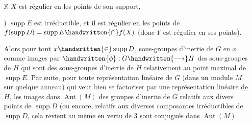
$\mathbb{X}$  $X$ est régulier en les points de son support\handwritten{)},

) $\operatorname{supp}E$ est irréductible, et il est régulier en les points de $f(\operatorname{supp}D)=\operatorname{supp}E\handwritten{\cap}f(X)$ (donc $Y$ est régulier en ses points).

Alors pour tout $x\handwritten{\in}\operatorname{supp}D$,  sous-groupes d'inertie de $G$ en $x$  comme images par $\handwritten{\phi}:G\handwritten{\longrightarrow}H$ des sous-groupes de $H$ qui sont des sous-groupes d'inertie de $H$ relativement au point maximal de $\operatorname{supp}E$. Par suite, pour toute représentation linéaire de $G$ (dans un module $M$ sur quelque anneau)  qui veut bien se factoriser par une représentation linéaire \uline{de} $H$, les images dans $\operatorname{Aut}(M)$ des groupes d'inertie  de $G$ relatifs aux divers points de $\operatorname{supp}D$ (ou encore, relatifs aux diverses composantes irréductibles de $\operatorname{supp}D$, cela revient au même en vertu de 3\handwritten{)} sont conjugués dans $\operatorname{Aut}(M)$.

